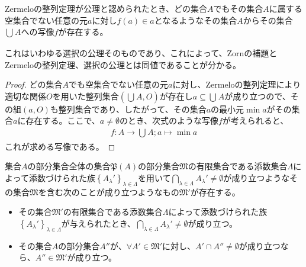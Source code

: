 \documentclass[dvipdfmx]{jsarticle}
\begin{document}
\begin{thm}\label{1.3.3.10}
Zermeloの整列定理が公理と認められたとき、どの集合$A$でもその集合$A$に属する空集合でない任意の元$a$に対し$f(a) \in a$となるようなその集合$A$からその集合$\bigcup_{} A$への写像$f$が存在する。
\end{thm}\par
これはいわゆる選択の公理そのものであり、これによって、Zornの補題とZermeloの整列定理、選択の公理とは同値であることが分かる。
\begin{proof}
どの集合$A$でも空集合でない任意の元$a$に対し、Zermeloの整列定理により適切な関係$O$を用いた整列集合$\left( \bigcup_{} A,O \right)$が存在し$a \subseteq \bigcup_{} A$が成り立つので、その組$(a,O)$も整列集合であり、したがって、その集合$a$の最小元$\min a$がその集合$a$に存在する。ここで、$a \neq \emptyset$のとき、次式のような写像$f$が考えられると、
\begin{align*}
f:A \rightarrow \bigcup_{} A;a \mapsto \min a
\end{align*}
これが求める写像である。
\end{proof}
\begin{thm}\label{1.3.3.11}
集合$A$の部分集合全体の集合$\mathfrak{P}(A)$の部分集合$\mathfrak{M}$の有限集合である添数集合$\varLambda $によって添数づけられた族$\left\{ A_{\lambda}' \right\}_{\lambda \in \varLambda }$を用いて$\bigcap_{\lambda \in \varLambda } A_{\lambda}' \neq \emptyset$が成り立つようなその集合$\mathfrak{M}$を含む次のことが成り立つようなもの$\mathfrak{M}'$が存在する。
\begin{itemize}
  \item
    その集合$\mathfrak{M}'$の有限集合である添数集合$\varLambda $によって添数づけられた族$\left\{ A_{\lambda}' \right\}_{  \lambda \in \varLambda }$が与えられたとき、$\bigcap_{  \lambda \in \varLambda } A_{\lambda}' \neq \emptyset$が成り立つ。
  \item
    その集合$A$の部分集合$A''$が、$\forall A' \in \mathfrak{M}'$に対し、$A' \cap A'' \neq \emptyset$が成り立つなら、$A'' \in \mathfrak{M}'$が成り立つ。
\end{itemize}
\end{thm}
\end{document}
